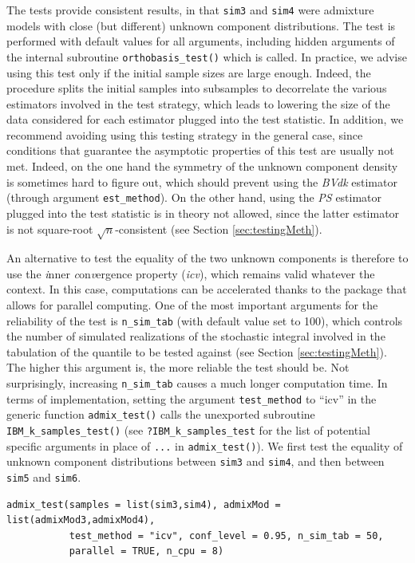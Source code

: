 The tests provide consistent results, in that \texttt{sim3} and \texttt{sim4} were admixture models with close (but different) unknown component distributions. The test is performed with default values for all arguments, including hidden arguments of the internal subroutine \texttt{orthobasis\_test()} which is called. In practice, we advise using this test only if the initial sample sizes are large enough. Indeed, the procedure splits the initial samples into subsamples to decorrelate the various estimators involved in the test strategy, which leads to lowering the size of the data considered for each estimator plugged into the test statistic.
In addition, we recommend avoiding using this testing strategy in the general case, since conditions that guarantee the asymptotic properties of this test are usually not met. Indeed, on the one hand the symmetry of the unknown component density is sometimes hard to figure out, which should prevent using the \emph{BVdk} estimator (through argument \texttt{est\_method}). On the other hand, using the \emph{PS} estimator plugged into the test statistic is in theory not allowed, since the latter estimator is not square-root \(\sqrt{n}\)-consistent (see Section \ref{sec:testingMeth}).

An alternative to test the equality of the two unknown components is therefore to use the \emph{i}nner \emph{c}on\emph{v}ergence property (\emph{icv}), which remains valid whatever the context. In this case, computations can be accelerated thanks to the package  that allows for parallel computing. One of the most important arguments for the reliability of the test is \texttt{n\_sim\_tab} (with default value set to 100), which controls the number of simulated realizations of the stochastic integral involved in the tabulation of the quantile to be tested against (see Section \ref{sec:testingMeth}). The higher this argument is, the more reliable the test should be. Not surprisingly, increasing \texttt{n\_sim\_tab} causes a much longer computation time. In terms of implementation, setting the argument \texttt{test\_method} to ``icv'' in the generic function \texttt{admix\_test()} calls the unexported subroutine \texttt{IBM\_k\_samples\_test()} (see \texttt{?IBM\_k\_samples\_test} for the list of potential specific arguments in place of \texttt{...} in \texttt{admix\_test()}). We first test the equality of unknown component distributions between \texttt{sim3} and \texttt{sim4}, and then between \texttt{sim5} and \texttt{sim6}.

\begin{verbatim}
admix_test(samples = list(sim3,sim4), admixMod = list(admixMod3,admixMod4),
           test_method = "icv", conf_level = 0.95, n_sim_tab = 50,
           parallel = TRUE, n_cpu = 8)
\end{verbatim}

